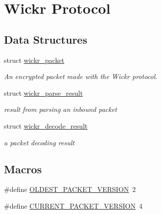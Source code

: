 \hypertarget{group__wickr__protocol}{}\section{Wickr Protocol}
\label{group__wickr__protocol}
\subsection*{Data Structures}
\begin{DoxyCompactItemize}
\item 
struct \mbox{\hyperlink{structwickr__packet}{wickr\+\_\+packet}}
\begin{DoxyCompactList}\small\item\em An encrypted packet made with the Wickr protocol. \end{DoxyCompactList}\item 
struct \mbox{\hyperlink{structwickr__parse__result}{wickr\+\_\+parse\+\_\+result}}
\begin{DoxyCompactList}\small\item\em result from parsing an inbound packet \end{DoxyCompactList}\item 
struct \mbox{\hyperlink{structwickr__decode__result}{wickr\+\_\+decode\+\_\+result}}
\begin{DoxyCompactList}\small\item\em a packet decoding result \end{DoxyCompactList}\end{DoxyCompactItemize}
\subsection*{Macros}
\begin{DoxyCompactItemize}
\item 
\#define \mbox{\hyperlink{group__wickr__protocol_gad269883d0b8b26c4fa52da595ef5ddf7}{O\+L\+D\+E\+S\+T\+\_\+\+P\+A\+C\+K\+E\+T\+\_\+\+V\+E\+R\+S\+I\+ON}}~2
\item 
\#define \mbox{\hyperlink{group__wickr__protocol_ga89ff9f93c5494db53d3ff27353989862}{C\+U\+R\+R\+E\+N\+T\+\_\+\+P\+A\+C\+K\+E\+T\+\_\+\+V\+E\+R\+S\+I\+ON}}~4
\end{DoxyCompactItemize}
